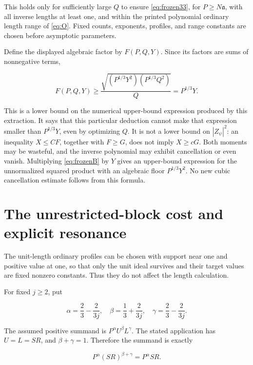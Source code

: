 \documentclass[11pt]{article}
\theoremstyle{remark}\newtheorem{remark}[theorem]{Remark}
\begin{document}
This holds only for sufficiently large \(Q\) to ensure \eqref{eq:frozen33}, for \(P\ge N\mathfrak a\), with all inverse lengths at least one, and within the printed polynomial ordinary length range of \eqref{eq:O}. Fixed counts, exponents, profiles, and range constants are chosen before asymptotic parameters.

Define the displayed algebraic factor by \(F(P,Q,Y)\). Since its factors are sums of nonnegative terms,

\begin{equation}
F(P,Q,Y)
\ge\frac{\sqrt{(P^{1/3}Y^2)(P^{1/3}Q^2)}}{Q}
=P^{1/3}Y.
\label{eq:frozen43}
\end{equation}

This is a lower bound on the numerical upper-bound expression produced by this extraction. It says that this particular deduction cannot make that expression smaller than \(P^{1/3}Y\), even by optimizing \(Q\). It is not a lower bound on \(|Z_\psi|^2\): an inequality \(X\le C F\), together with \(F\ge G\), does not imply \(X\ge cG\). Both moments may be wasteful, and the inverse polynomial may exhibit cancellation or even vanish. Multiplying \eqref{eq:frozenB} by \(Y\) gives an upper-bound expression for the unnormalized squared product with an algebraic floor \(P^{1/3}Y^2\). No new cubic cancellation estimate follows from this formula.

\section{The unrestricted-block cost and explicit resonance}\label{the-unrestricted-block-cost-and-explicit-resonance}

The unit-length ordinary profiles can be chosen with support near one and positive value at one, so that only the unit ideal survives and their target values are fixed nonzero constants. Thus they do not affect the length calculation.

For fixed \(j\ge2\), put

\[
\alpha=\frac23-\frac{2}{3j},\quad
\beta=\frac13+\frac{2}{3j},\quad
\gamma=\frac23-\frac{2}{3j}.
\]

The assumed positive summand is \(P^\alpha U^\beta L^\gamma\). The stated application has \(U=L=SR\), and \(\beta+\gamma=1\). Therefore the summand is exactly

\begin{equation}
P^\alpha(SR)^{\beta+\gamma}=P^\alpha SR.
\label{eq:frozen51}
\end{equation}
\end{document}
